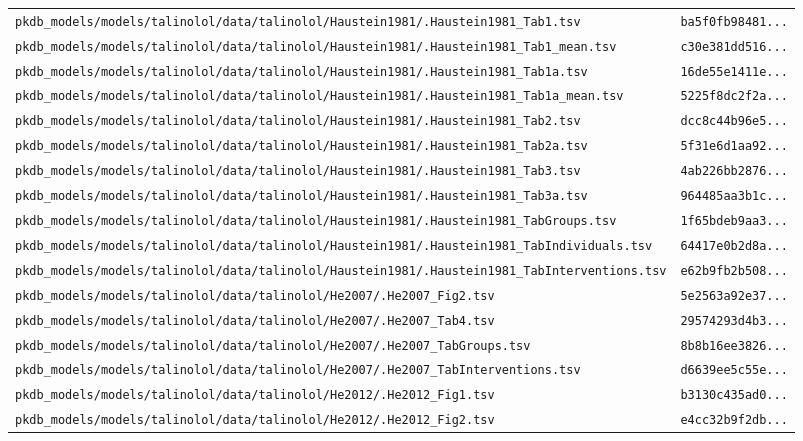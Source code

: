 \begin{longtable}{ll}
\texttt{pkdb\_models/models/talinolol/data/talinolol/Haustein1981/.Haustein1981\_Tab1.tsv} & \texttt{ba5f0fb98481...} \\
\texttt{pkdb\_models/models/talinolol/data/talinolol/Haustein1981/.Haustein1981\_Tab1\_mean.tsv} & \texttt{c30e381dd516...} \\
\texttt{pkdb\_models/models/talinolol/data/talinolol/Haustein1981/.Haustein1981\_Tab1a.tsv} & \texttt{16de55e1411e...} \\
\texttt{pkdb\_models/models/talinolol/data/talinolol/Haustein1981/.Haustein1981\_Tab1a\_mean.tsv} & \texttt{5225f8dc2f2a...} \\
\texttt{pkdb\_models/models/talinolol/data/talinolol/Haustein1981/.Haustein1981\_Tab2.tsv} & \texttt{dcc8c44b96e5...} \\
\texttt{pkdb\_models/models/talinolol/data/talinolol/Haustein1981/.Haustein1981\_Tab2a.tsv} & \texttt{5f31e6d1aa92...} \\
\texttt{pkdb\_models/models/talinolol/data/talinolol/Haustein1981/.Haustein1981\_Tab3.tsv} & \texttt{4ab226bb2876...} \\
\texttt{pkdb\_models/models/talinolol/data/talinolol/Haustein1981/.Haustein1981\_Tab3a.tsv} & \texttt{964485aa3b1c...} \\
\texttt{pkdb\_models/models/talinolol/data/talinolol/Haustein1981/.Haustein1981\_TabGroups.tsv} & \texttt{1f65bdeb9aa3...} \\
\texttt{pkdb\_models/models/talinolol/data/talinolol/Haustein1981/.Haustein1981\_TabIndividuals.tsv} & \texttt{64417e0b2d8a...} \\
\texttt{pkdb\_models/models/talinolol/data/talinolol/Haustein1981/.Haustein1981\_TabInterventions.tsv} & \texttt{e62b9fb2b508...} \\
\texttt{pkdb\_models/models/talinolol/data/talinolol/He2007/.He2007\_Fig2.tsv} & \texttt{5e2563a92e37...} \\
\texttt{pkdb\_models/models/talinolol/data/talinolol/He2007/.He2007\_Tab4.tsv} & \texttt{29574293d4b3...} \\
\texttt{pkdb\_models/models/talinolol/data/talinolol/He2007/.He2007\_TabGroups.tsv} & \texttt{8b8b16ee3826...} \\
\texttt{pkdb\_models/models/talinolol/data/talinolol/He2007/.He2007\_TabInterventions.tsv} & \texttt{d6639ee5c55e...} \\
\texttt{pkdb\_models/models/talinolol/data/talinolol/He2012/.He2012\_Fig1.tsv} & \texttt{b3130c435ad0...} \\
\texttt{pkdb\_models/models/talinolol/data/talinolol/He2012/.He2012\_Fig2.tsv} & \texttt{e4cc32b9f2db...} \\

\end{longtable}
